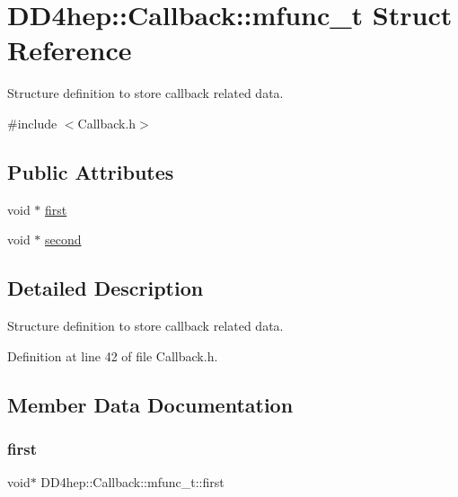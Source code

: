 \hypertarget{struct_d_d4hep_1_1_callback_1_1mfunc__t}{}\section{D\+D4hep\+:\+:Callback\+:\+:mfunc\+\_\+t Struct Reference}
\label{struct_d_d4hep_1_1_callback_1_1mfunc__t}


Structure definition to store callback related data.  




{\ttfamily \#include $<$Callback.\+h$>$}

\subsection*{Public Attributes}
\begin{DoxyCompactItemize}
\item 
void $\ast$ \hyperlink{struct_d_d4hep_1_1_callback_1_1mfunc__t_aa42e9aa800dd766438a6097fad5126fd}{first}
\item 
void $\ast$ \hyperlink{struct_d_d4hep_1_1_callback_1_1mfunc__t_a510bbd3c9df48a5a950c9b7e4ea9eadc}{second}
\end{DoxyCompactItemize}


\subsection{Detailed Description}
Structure definition to store callback related data. 

Definition at line 42 of file Callback.\+h.



\subsection{Member Data Documentation}
\hypertarget{struct_d_d4hep_1_1_callback_1_1mfunc__t_aa42e9aa800dd766438a6097fad5126fd}{}\label{struct_d_d4hep_1_1_callback_1_1mfunc__t_aa42e9aa800dd766438a6097fad5126fd} 
\subsubsection{\texorpdfstring{first}{first}}
{\footnotesize\ttfamily void$\ast$ D\+D4hep\+::\+Callback\+::mfunc\+\_\+t\+::first}



